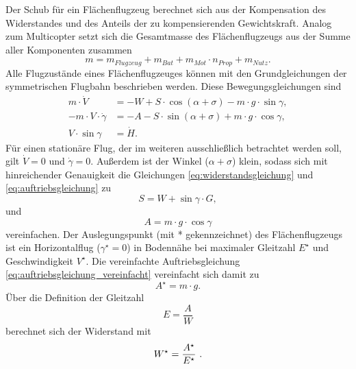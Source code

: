 Der Schub für ein Flächenflugzeug berechnet sich aus der Kompensation des Widerstandes und des Anteils der zu kompensierenden Gewichtskraft. Analog zum Multicopter setzt sich die Gesamtmasse des Flächenflugzeugs aus der Summe aller Komponenten zusammen
\begin{equation}
	m = m_{Flugzeug}+m_{Bat}+m_{Mot}\cdot n_{Prop}+m_{Nutz}.
\end{equation}
Alle Flugzustände eines Flächenflugzeuges können mit den Grundgleichungen der symmetrischen Flugbahn beschrieben werden. Diese Bewegungsgleichungen \cite[S.77]{Bruning.1986} sind
\begin{align}
	m\cdot \dot{V} &= -W + S\cdot\cos(\alpha+\sigma)-m\cdot g\cdot\sin\gamma , \label{eq:widerstandsgleichung} \\ 
	-m\cdot V\cdot\dot{\gamma} &= -A - S\cdot\sin(\alpha+\sigma)+m\cdot g\cdot\cos\gamma , \label{eq:auftriebsgleichung} \\ 
	V\cdot\sin\gamma &= \dot{H}. \label{eq:steiggleichung}
\end{align}	
Für einen stationäre Flug, der im weiteren ausschließlich betrachtet werden soll, gilt \ensuremath{\dot{V} = 0} und \ensuremath{\dot{\gamma} = 0}. Außerdem ist der Winkel (\ensuremath{\alpha + \sigma}) klein, sodass sich mit hinreichender Genauigkeit die Gleichungen \eqref{eq:widerstandsgleichung} und \eqref{eq:auftriebsgleichung} zu
\begin{equation}
	S = W + \sin\gamma\cdot G, 
	\label{eq:widerstandsgleichung_vereinfacht}
\end{equation}
und
\begin{equation}
	A = m\cdot g\cdot\cos\gamma 
	\label{eq:auftriebsgleichung_vereinfacht}
\end{equation} 
vereinfachen. Der Auslegungspunkt (mit * gekennzeichnet) des Flächenflugzeugs ist ein Horizontalflug (\ensuremath{\gamma^\star = 0}) in Bodennähe bei maximaler Gleitzahl \ensuremath{E^\star} und Geschwindigkeit \ensuremath{V^\star}. Die vereinfachte Auftriebsgleichung \eqref{eq:auftriebsgleichung_vereinfacht} vereinfacht sich damit zu
\begin{equation}
	A^\star = m\cdot g .
\end{equation}
Über die Definition der Gleitzahl \cite[S.49]{Bruning.1986}
\begin{equation}
	E = \frac{A}{W}
	\label{eq:gleitzahl}
\end{equation}
berechnet sich der Widerstand mit
\begin{equation}
	W^\star = \frac{A^\star}{E^\star} ~\text{.}
\end{equation}
